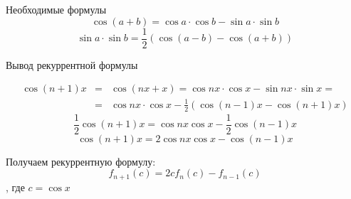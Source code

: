 \documentclass{revtex4}
\begin{document}
\begin{section}{Необходимые формулы}
 $$ \cos(a+b) = \cos a \cdot \cos b - \sin a \cdot \sin b $$
 $$ \sin a \cdot \sin b = \frac12 \left( \cos(a-b) - \cos(a+b) \right) $$
\end{section}

\begin{section}{Вывод рекуррентной формулы}

  \begin{eqnarray*} %
  \cos (n+1)x &=& \cos(nx+x) = \cos nx \cdot \cos x - \sin nx \cdot \sin x = \\
              &=& \cos nx \cdot \cos x - \frac12 \left( \cos (n-1)x - \cos (n+1)x \right)
  \end{eqnarray*}
  $$ \frac12 \cos(n+1)x = \cos nx \cos x - \frac12 \cos(n-1)x $$
  $$ \cos(n+1)x = 2 \cos nx \cos x - \cos(n-1)x $$

Получаем рекуррентную формулу:
  $$ f_{n+1}(c) = 2c f_n(c) - f_{n-1}(c) $$
, где $c = \cos x$

\end{section}
\end{document}
